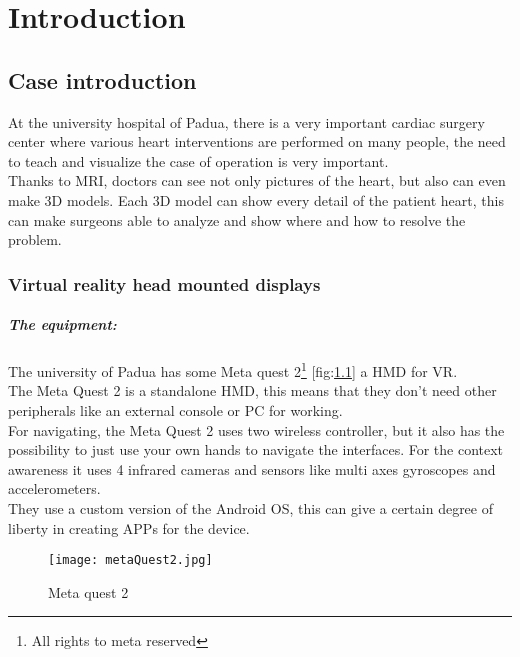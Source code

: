 
\chapter{Introduction}
\label{chp:intro}

\section{Case introduction}

At the university hospital of Padua, 
there is a very important cardiac surgery center where various heart interventions are performed on many people,
the need to teach and visualize the case of operation is very important. \\
Thanks to MRI, doctors can see not only pictures of the heart, but also can even make 3D models.
Each 3D model can show every detail of the patient heart, this can make surgeons able to analyze and show where and how to resolve the problem.

\subsection{Virtual reality head mounted displays}

\paragraph{The equipment:}
The university of Padua has some Meta quest 2\footnote{All rights to meta reserved} [fig:\ref{fig:metaQuest2}] a \ac{HMD} for \ac{VR}. \\
The Meta Quest 2 is a standalone \ac{HMD}, this means that they don't need other peripherals like an external console or \ac{PC} for working.\\
For navigating, the Meta Quest 2 uses two wireless controller, but it also has the possibility to just use your own hands to navigate the interfaces.
For the context awareness it uses 4 infrared cameras and sensors like multi axes gyroscopes and accelerometers.\\
They use a custom version of the Android \ac{OS}, this can give a certain degree of liberty in creating APPs for the device.

\begin{figure}[h]
  \centering
  \texttt{[image: metaQuest2.jpg]}
  \caption{Meta quest 2}
  \label{fig:metaQuest2}
\end{figure}

